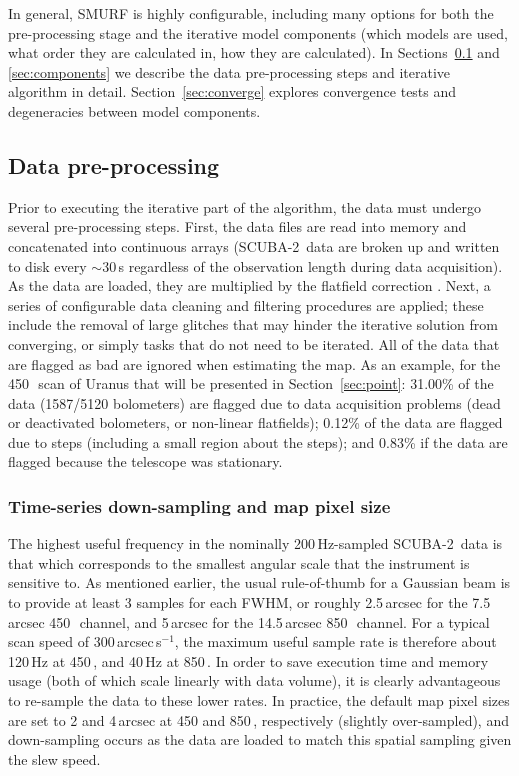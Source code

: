 \documentclass[useAMS,usenatbib,nofootinbib]{mn2e}
\newcommand{\scuba}{SCUBA-2}
\begin{document}
In general, SMURF is highly configurable, including many options for
both the pre-processing stage and the iterative model components
(which models are used, what order they are calculated in, how they
are calculated).  In Sections~\ref{sec:dataprep} and
\ref{sec:components} we describe the data pre-processing steps and
iterative algorithm in detail. Section~\ref{sec:converge} explores
convergence tests and degeneracies between model components.


\subsection{Data pre-processing}
\label{sec:dataprep}

Prior to executing the iterative part of the algorithm, the data must
undergo several pre-processing steps. First, the data files are read
into memory and concatenated into continuous arrays (\scuba\ data are
broken up and written to disk every $\sim$30\,s regardless of the
observation length during data acquisition). As the data are loaded,
they are multiplied by the flatfield correction \citep[see Section~2.1
in][]{dempsey2012}. Next, a series of configurable data cleaning and
filtering procedures are applied; these include the removal of large
glitches that may hinder the iterative solution from converging, or
simply tasks that do not need to be iterated. All of the data that are
flagged as bad are ignored when estimating the map. As an example, for
the 450\,\micron\ scan of Uranus that will be presented in
Section~\ref{sec:point}: 31.00\% of the data (1587/5120 bolometers)
are flagged due to data acquisition problems (dead or deactivated
bolometers, or non-linear flatfields); 0.12\% of the data are flagged
due to steps (including a small region about the steps); and 0.83\% if
the data are flagged because the telescope was stationary.

\subsubsection{Time-series down-sampling and map pixel size}
\label{sec:downsamp}

The highest useful frequency in the nominally 200\,Hz-sampled \scuba\
data is that which corresponds to the smallest angular scale that the
instrument is sensitive to. As mentioned earlier, the usual
rule-of-thumb for a Gaussian beam is to provide at least 3 samples for
each FWHM, or roughly 2.5\,arcsec for the 7.5\,arcsec 450\,\micron\
channel, and 5\,arcsec for the 14.5\,arcsec 850\,\micron\ channel. For
a typical scan speed of 300\,arcsec\,s$^{-1}$, the maximum useful
sample rate is therefore about 120\,Hz at 450\,\micron, and 40\,Hz at
850\,\micron. In order to save execution time and memory usage (both
of which scale linearly with data volume), it is clearly advantageous
to re-sample the data to these lower rates. In practice, the default
map pixel sizes are set to 2 and 4\,arcsec at 450 and 850\,\micron,
respectively (slightly over-sampled), and down-sampling occurs as the
data are loaded to match this spatial sampling given the slew speed.
\end{document}
